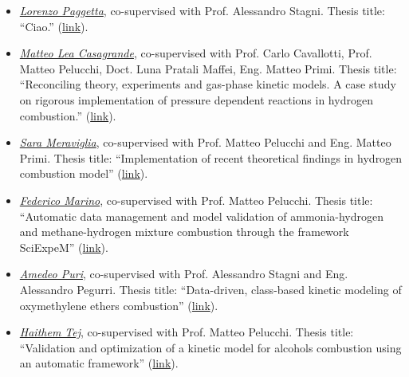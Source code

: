 
\begin{itemize}
   \item [ ] \ul{\it Lorenzo Paggetta}, co-supervised with Prof. Alessandro Stagni.
      Thesis title: ``Ciao.'' (\href{}{link}).

   \item [ ] \ul{\it Matteo Lea Casagrande}, co-supervised with Prof. Carlo Cavallotti,
      Prof. Matteo Pelucchi, Doct. Luna Pratali Maffei, Eng. Matteo Primi. Thesis title:
      ``Reconciling theory, experiments and gas-phase kinetic models. A case study on
      rigorous implementation of pressure dependent reactions in hydrogen combustion.''
      (\href{https://hdl.handle.net/10589/226533}{link}).

   \item [ ] \ul{\it Sara Meraviglia}, co-supervised with Prof. Matteo Pelucchi and Eng.
      Matteo Primi. Thesis title: ``Implementation of recent theoretical findings in
      hydrogen combustion model'' (\href{https://hdl.handle.net/10589/214934}{link}).

   \item [ ] \ul{\it Federico Marino}, co-supervised with Prof. Matteo Pelucchi. Thesis
      title: ``Automatic data management and model validation of ammonia-hydrogen and
      methane-hydrogen mixture combustion through the framework SciExpeM''
      (\href{https://hdl.handle.net/10589/212616}{link}).

   \item [ ] \ul{\it Amedeo Puri}, co-supervised with Prof. Alessandro Stagni and Eng.
      Alessandro Pegurri. Thesis title: ``Data-driven, class-based kinetic modeling of
      oxymethylene ethers combustion'' (\href{https://hdl.handle.net/10589/206686}{link}).

   \item [ ] \ul{\it Haithem Tej}, co-supervised with Prof. Matteo Pelucchi. Thesis title:
      ``Validation and optimization of a kinetic model for alcohols combustion using an
      automatic framework'' (\href{https://hdl.handle.net/10589/210401}{link}).

\end{itemize}
